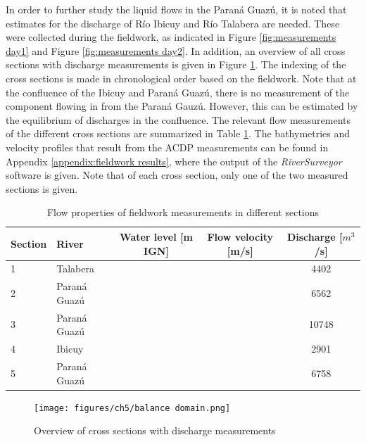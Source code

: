 In order to further study the liquid flows in the Paraná Guazú, it is noted that estimates for the discharge of Río Ibicuy and Río Talabera are needed. These were collected during the fieldwork, as indicated in Figure \ref{fig:measurements day1} and Figure \ref{fig:measurements day2}. In addition, an overview of all cross sections with discharge measurements is given in Figure \ref{fig:cross section domain}. The indexing of the cross sections is made in chronological order based on the fieldwork. Note that at the confluence of the Ibicuy and Paraná Guazú, there is no measurement of the component flowing in from the Paraná Gauzú. However, this can be estimated by the equilibrium of discharges in the confluence. The relevant flow measurements of the different cross sections are summarized in Table \ref{tab:discharges fieldwork}. The bathymetries and velocity profiles that result from the ACDP measurements can be found in Appendix \ref{appendix:fieldwork results}, where the output of the \textit{RiverSurveyor} software is given. Note that of each cross section, only one of the two measured sections is given. 

\begin{table}[H]
    \centering
    \renewcommand{\arraystretch}{1.2} %
    \setlength{\tabcolsep}{8pt}       %
    \begin{tabular}{llccc}
        \toprule
        \textbf{Section} & \textbf{River} & \textbf{Water level [m IGN]} & \textbf{Flow velocity [m/s]} & \textbf{Discharge [$m^3$/s]} \\
        \midrule
        1 & Talabera       &  &  & 4402 \\
        2 & Paraná Guazú   &  &  & 6562 \\
        3 & Paraná Guazú   &  &  & 10748 \\
        4 & Ibicuy         &  &  & 2901 \\
        5 & Paraná Guazú   &  &  & 6758 \\
        \bottomrule
    \end{tabular}
    \caption{Flow properties of fieldwork measurements in different sections}
    \label{tab:discharges fieldwork}
\end{table}


\begin{figure}[H]
    \centering
    \texttt{[image: figures/ch5/balance domain.png]}
    \caption{Overview of cross sections with discharge measurements}
    \label{fig:cross section domain}
\end{figure}



